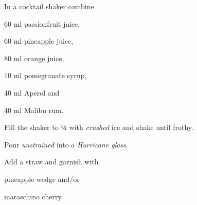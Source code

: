\startsection[title={Sunflower},reference=sunflower]
\startitemize
\item In a cocktail shaker combine
      \startitemize
      \item 60 ml passionfruit juice,
      \item 60 ml pineapple juice,
      \item 80 ml orange juice,
      \item 10 ml pomegranate syrup,
      \item 40 ml Aperol and
      \item 40 ml Malibu rum.
      \stopitemize
\item Fill the shaker to ¾ with {\em crushed} ice and shake until frothy.
\item Pour {\em unstrained} into a {\em Hurricane glass}.
\item Add a straw and garnish with
      \startitemize
      \item pineapple wedge and/or
      \item maraschino cherry.
      \stopitemize
\stopitemize
\stopsection
